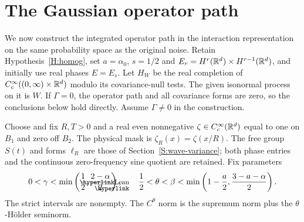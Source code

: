 \section{The Gaussian operator path}
\label{S:actual-operator-driver}

We now construct the integrated operator path in the interaction representation
on the same probability space as the original noise. Retain
Hypothesis~\ref{H:homog}, set $a = \alpha_0$, $s = 1/2$ and $E_r =
H^r(\mathbb{R}^d)\times H^{r-1}(\mathbb{R}^d)$, and initially use real phases $E = E_s$. Let
$H_W$ be the real completion of $C_c^\infty((0,\infty)\times\mathbb{R}^d)$ modulo its
covariance-null tests. The given isonormal process on it is $W$. If $\Gamma =
0$, the operator path and all covariance forms are zero, so the conclusions
below hold directly. Assume $\Gamma \ne 0$ in the construction.

Choose and fix $R,T > 0$ and a real even nonnegative $\zeta \in
C_c^\infty(\mathbb{R}^d)$ equal to one on $B_1$ and zero off $B_2$. The physical mask is
$\zeta_R(x) = \zeta(x/R)$. The free group $S(t)$ and forms $\ell_R$ are those of
Section~\ref{S:wave-variance}; both phase entries and the continuous
zero-frequency sine quotient are retained. Fix parameters
\begin{equation}\label{E:driver-parameters}
  \LeanEqMarker{E:driver-parameters}
  0<\gamma<\min\left(\frac12,\frac{2-\alpha}{2}\right),\qquad
  \frac12<\theta<\beta<\min\left(1-\frac a2,
  \frac{3-a-\alpha}{2}\right).
\end{equation}
The strict intervals are nonempty. The $C^\theta$ norm is the supremum norm plus
the $\theta$-H\"older seminorm.

